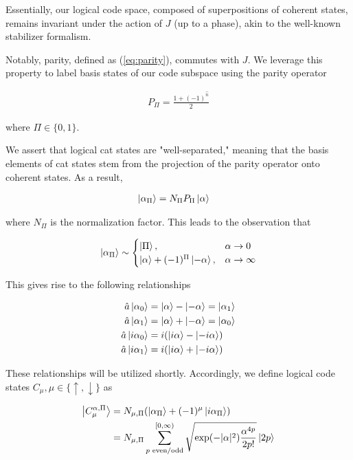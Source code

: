 \documentclass[11pt]{article}
\newcommand\0{\mathbf{0}}
\newcommand\<{\langle}
\renewcommand\>{\rangle}
\begin{document}
Essentially, our logical code space, composed of superpositions of coherent states, remains invariant under the action of $J$ (up to a phase), akin to the well-known stabilizer formalism.

Notably, parity, defined as (\ref{eq:parity}), commutes with $J$. We leverage this property to label basis states of our code subspace using the parity operator

\begin{align*}
P_{\Pi} = \frac{1+(-1)^{\hat{n}}}{2}	
\end{align*}

where $\Pi \in \{0, 1\}$.

We assert that logical cat states are "well-separated," meaning that the basis elements of cat states stem from the projection of the parity operator onto coherent states. As a result,

\begin{align*}
\ket{\alpha_\Pi} &= N_\Pi P_\Pi \ket{\alpha}
\end{align*}

where $N_\Pi$ is the normalization factor. This leads to the observation that

\begin{align*}
\ket{\alpha_\Pi} \sim \begin{cases} \ket{\Pi},  &\alpha \rightarrow 0\\ \ket{\alpha} + (-1)^\Pi \ket{-\alpha}, &\alpha \rightarrow \infty \end{cases}
\end{align*}

This gives rise to the following relationships

\begin{align}
\label{eq:cat-rels}
\begin{split}
\hat{a} \ket{\alpha_0} &= \ket{\alpha} - \ket{-\alpha} = \ket{\alpha_1} \\
\hat{a} \ket{\alpha_1} &= \ket{\alpha} + \ket{-\alpha} = \ket{\alpha_0} \\
\hat{a} \ket{i\alpha_0} &= i(\ket{i\alpha} - \ket{-i\alpha})\\
\hat{a} \ket{i\alpha_1} &= i(\ket{i\alpha}  + \ket{-i\alpha})
\end{split}
\end{align}

These relationships will be utilized shortly. Accordingly, we define logical code states $C_\mu, \mu \in \{ \uparrow, \downarrow \}$ as 

\begin{align*}
\ket{C_\mu^{\alpha, \Pi}} &= N_{\mu, \Pi} (\ket{\alpha_\Pi} + (-1)^\mu \ket{i \alpha_\Pi})\\
&= N_{\mu, \Pi} \sum_{p\text{ even/odd}}^{[0, \infty)}\sqrt{\exp(-|\alpha|^2)\frac{
\alpha^{4p}}{2p!}}\ket{2p}
\end{align*}
\end{document}
